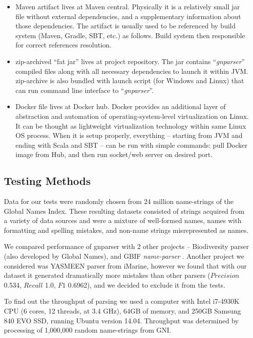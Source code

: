 \documentclass{bmcart}
\begin{document}
\begin{itemize}
  \item Maven artifact lives at Maven central. Physically it is a relatively
  small jar file without external dependencies, and a supplementary
  information about those dependencies. The artifact is usually used to be
  referenced by build system (Maven, Gradle, SBT, etc.) as follows. Build
  system then responsible for correct references resolution.
  \item zip-archived ``fat jar'' lives at project repository. The jar contains
  ``\textit{gnparser}'' compiled files along with all necessary dependencies
  to launch it within JVM. zip-archive is also bundled with launch script (for
  Windows and Linux) that can run command line interface to
  ``\textit{gnparser}''.
  \item Docker file lives at Docker hub. Docker provides an additional layer
  of abstraction and automation of operating-system-level virtualization on
  Linux. It can be thought as lightweight virtualization technology within
  same Linux OS process. When it is setup properly, everything -- starting
  from JVM and ending with Scala and SBT -- can be run with simple commands:
  pull Docker image from Hub, and then run socket/web server on desired port.
\end{itemize}

\subsection*{Testing Methods}

Data for our tests were randomly chosen from 24 million name-strings of the
Global Names Index. These resulting datasets consisted of strings acquired
from a variety of data sources and were a mixture of well-formed names, names
with formatting and spelling mistakes, and non-name strings misrepresented as
names.

We compared performance of gnparser with 2 other projects -- Biodiversity
parser\cite{biodiversity} (also developed by Global Names), and GBIF
\textit{name-parser} \cite{gbifNameParser}. Another project we considered was
YASMEEN parser from iMarine\cite{VandenBerghe2015}, however we found that with
our dataset it generated dramatically more mistakes than other parsers
($Precision$ 0.534, $Recall$ 1.0, $F1$ 0.6962), and we decided to exclude it
from the tests.

To find out the throughput of parsing we used a computer with Intel i7-4930K
CPU (6 cores, 12 threads, at 3.4 GHz), 64GB of memory, and 250GB Samsung 840
EVO SSD, running Ubuntu version 14.04. Throughput was determined by processing
of 1,000,000 random name-strings from GNI.
\end{document}
